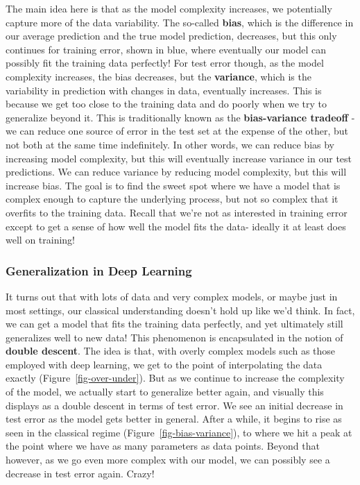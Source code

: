 \documentclass[
  letterpaper,
]{krantz}
\begin{document}
The main idea here is that as the model complexity increases, we
potentially capture more of the data variability. The so-called
\textbf{bias}, which is the difference in our average prediction and the
true model prediction, decreases, but this only continues for training
error, shown in blue, where eventually our model can possibly fit the
training data perfectly! For test error though, as the model complexity
increases, the bias decreases, but the \textbf{variance}, which is the
variability in prediction with changes in data, eventually increases.
This is because we get too close to the training data and do poorly when
we try to generalize beyond it. This is traditionally known as the
\textbf{bias-variance tradeoff} - we can reduce one source of error in
the test set at the expense of the other, but not both at the same time
indefinitely. In other words, we can reduce bias by increasing model
complexity, but this will eventually increase variance in our test
predictions. We can reduce variance by reducing model complexity, but
this will increase bias. The goal is to find the sweet spot where we
have a model that is complex enough to capture the underlying process,
but not so complex that it overfits to the training data. Recall that
we're not as interested in training error except to get a sense of how
well the model fits the data- ideally it at least does well on training!

\subsubsection{Generalization in Deep
Learning}\label{generalization-in-deep-learning}

It turns out that with lots of data and very complex models, or maybe
just in most settings, our classical understanding doesn't hold up like
we'd think. In fact, we can get a model that fits the training data
perfectly, and yet ultimately still generalizes well to new data! This
phenomenon is encapsulated in the notion of \textbf{double descent}. The
idea is that, with overly complex models such as those employed with
deep learning, we get to the point of interpolating the data exactly
(Figure~\ref{fig-over-under}). But as we continue to increase the
complexity of the model, we actually start to generalize better again,
and visually this displays as a double descent in terms of test error.
We see an initial decrease in test error as the model gets better in
general. After a while, it begins to rise as seen in the classical
regime (Figure~\ref{fig-bias-variance}), to where we hit a peak at the
point where we have as many parameters as data points. Beyond that
however, as we go even more complex with our model, we can possibly see
a decrease in test error again. Crazy!
\end{document}
